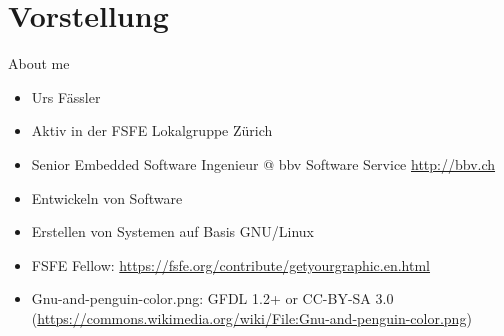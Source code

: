 
\section{Vorstellung}
\begin{frame}{About me}
	\begin{center}
		\hspace*{1cm}
	\end{center}
\end{frame}
\note
{
	\begin{itemize}
		\item Urs Fässler
		\item Aktiv in der FSFE Lokalgruppe Zürich
		\item Senior Embedded Software Ingenieur @ bbv Software Service \url{http://bbv.ch}
		\item Entwickeln von Software
		\item Erstellen von Systemen auf Basis GNU/Linux
		\item FSFE Fellow: \url{https://fsfe.org/contribute/getyourgraphic.en.html}
		\item Gnu-and-penguin-color.png: GFDL 1.2+ or CC-BY-SA 3.0 (\url{https://commons.wikimedia.org/wiki/File:Gnu-and-penguin-color.png})
	\end{itemize}
}

